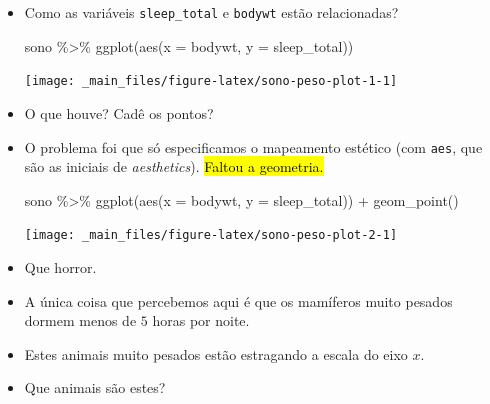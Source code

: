 \documentclass[
  11pt]{report}
\newenvironment{Shaded}{\begin{snugshade}}{\end{snugshade}}
\newcommand{\AttributeTok}[1]{\textcolor[rgb]{0.77,0.63,0.00}{#1}}
\newcommand{\FunctionTok}[1]{\textcolor[rgb]{0.00,0.00,0.00}{#1}}
\newcommand{\NormalTok}[1]{#1}
\newcommand{\SpecialCharTok}[1]{\textcolor[rgb]{0.00,0.00,0.00}{#1}}
\begin{document}
\begin{itemize}
\item
  Como as variáveis \texttt{sleep\_total} e \texttt{bodywt} estão relacionadas?

\begin{Shaded}
\begin{Highlighting}[]
\NormalTok{sono }\SpecialCharTok{\%\textgreater{}\%} 
  \FunctionTok{ggplot}\NormalTok{(}\FunctionTok{aes}\NormalTok{(}\AttributeTok{x =}\NormalTok{ bodywt, }\AttributeTok{y =}\NormalTok{ sleep\_total))}
\end{Highlighting}
\end{Shaded}

  \begin{center}\texttt{[image: \_main\_files/figure-latex/sono-peso-plot-1-1]} \end{center}
\item
  O que houve? Cadê os pontos?
\item
  O problema foi que só especificamos o mapeamento estético (com \texttt{aes}, que são as iniciais de \emph{aesthetics}). {\hl{Faltou a geometria.}}

\begin{Shaded}
\begin{Highlighting}[]
\NormalTok{sono }\SpecialCharTok{\%\textgreater{}\%} 
  \FunctionTok{ggplot}\NormalTok{(}\FunctionTok{aes}\NormalTok{(}\AttributeTok{x =}\NormalTok{ bodywt, }\AttributeTok{y =}\NormalTok{ sleep\_total)) }\SpecialCharTok{+}
  \FunctionTok{geom\_point}\NormalTok{()}
\end{Highlighting}
\end{Shaded}

  \begin{center}\texttt{[image: \_main\_files/figure-latex/sono-peso-plot-2-1]} \end{center}
\item
  Que horror.
\item
  A única coisa que percebemos aqui é que os mamíferos muito pesados dormem menos de \(5\) horas por noite.
\item
  Estes animais muito pesados estão estragando a escala do eixo \(x\).
\item
  Que animais são estes?


\end{itemize}
\end{document}
